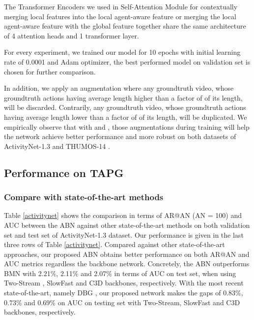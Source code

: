 \documentclass{ieeeaccess}
\begin{document}
The Transformer Encoders we used in Self-Attention Module for contextually merging local features into the local agent-aware feature or merging the local agent-aware feature with the global feature together share the same architecture of 4 attention heads and 1 transformer layer.

For every experiment, we trained our model for 10 epochs with initial learning rate of 0.0001 and Adam optimizer, the best performed model on validation set is chosen for further comparison.

In addition, we apply an augmentation where any groundtruth video, whose groundtruth actions having average length higher than a factor of  of its length, will be discarded. Contrarily, any groundtruth video, whose groundtruth actions having average length lower than a factor of  of its length, will be duplicated. We empirically observe that with  and , those augmentations during training will help the network achieve better performance and more robust on both datasets of ActivityNet-1.3 \cite{caba2015activitynet} and THUMOS-14 \cite{THUMOS14}.



\subsection{Performance on TAPG}
\subsubsection{Compare with state-of-the-art methods}

Table \ref{activitynet} shows the comparison in terms of AR@AN (AN = 100) and AUC between the ABN against other state-of-the-art methods on both validation set and test set of ActivityNet-1.3 \cite{caba2015activitynet} dataset. Our performance is given in the last three rows of Table \ref{activitynet}. Compared against other state-of-the-art approaches, our proposed ABN obtains better performance on both AR@AN and AUC metrics regardless the backbone network. Concretely, the ABN outperforms BMN with 2.21\%, 2.11\% and 2.07\% in terms of AUC on test set, when using Two-Stream \cite{2_stream_2}, SlowFast \cite{SlowFast} and C3D \cite{C3D_3} backbones, respectively. With the most recent state-of-the-art, namely DBG \cite{dbg}, our proposed network makes the gaps of 0.83\%, 0.73\% and 0.69\% on AUC on testing set with Two-Stream, SlowFast and C3D backbones, respectively.
\end{document}
